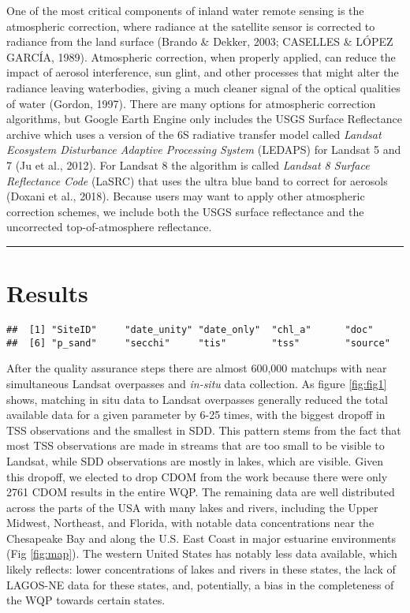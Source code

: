 \documentclass[]{article}
\begin{document}
One of the most critical components of inland water remote sensing is
the atmospheric correction, where radiance at the satellite sensor is
corrected to radiance from the land surface (Brando \& Dekker, 2003;
CASELLES \& LÓPEZ GARCÍA, 1989). Atmospheric correction, when properly
applied, can reduce the impact of aerosol interference, sun glint, and
other processes that might alter the radiance leaving waterbodies,
giving a much cleaner signal of the optical qualities of water (Gordon,
1997). There are many options for atmospheric correction algorithms, but
Google Earth Engine only includes the USGS Surface Reflectance archive
which uses a version of the 6S radiative transfer model called
\emph{Landsat Ecosystem Disturbance Adaptive Processing System} (LEDAPS)
for Landsat 5 and 7 (Ju et al., 2012). For Landsat 8 the algorithm is
called \emph{Landsat 8 Surface Reflectance Code} (LaSRC) that uses the
ultra blue band to correct for aerosols (Doxani et al., 2018). Because
users may want to apply other atmospheric correction schemes, we include
both the USGS surface reflectance and the uncorrected top-of-atmosphere
reflectance.

\begin{center}\rule{0.5\linewidth}{\linethickness}\end{center}

\hypertarget{results}{%
\section{Results}\label{results}}

\begin{verbatim}
##  [1] "SiteID"     "date_unity" "date_only"  "chl_a"      "doc"       
##  [6] "p_sand"     "secchi"     "tis"        "tss"        "source"
\end{verbatim}

After the quality assurance steps there are almost 600,000 matchups with
near simultaneous Landsat overpasses and \emph{in-situ} data collection.
As figure \ref{fig:fig1} shows, matching in situ data to Landsat
overpasses generally reduced the total available data for a given
parameter by 6-25 times, with the biggest dropoff in TSS observations
and the smallest in SDD. This pattern stems from the fact that most TSS
observations are made in streams that are too small to be visible to
Landsat, while SDD observations are mostly in lakes, which are visible.
Given this dropoff, we elected to drop CDOM from the work because there
were only 2761 CDOM results in the entire WQP. The remaining data are
well distributed across the parts of the USA with many lakes and rivers,
including the Upper Midwest, Northeast, and Florida, with notable data
concentrations near the Chesapeake Bay and along the U.S. East Coast in
major estuarine environments (Fig \ref{fig:map}). The western United
States has notably less data available, which likely reflects: lower
concentrations of lakes and rivers in these states, the lack of LAGOS-NE
data for these states, and, potentially, a bias in the completeness of
the WQP towards certain states.
\end{document}
